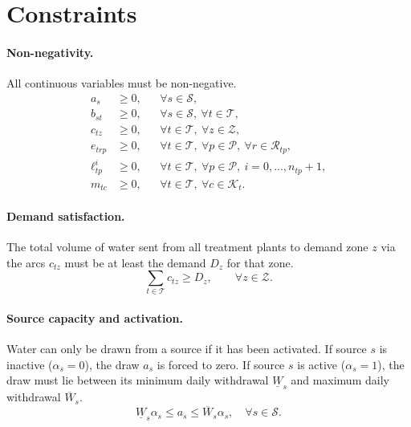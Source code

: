 \documentclass[10pt]{article}
\begin{document}
\section{Constraints} \label{sec:constraints} \paragraph{Non-negativity.}
All continuous variables must be non-negative.
\begin{equation}\label{eq:nonnegativity}
\begin{aligned}
    a_s &\ge 0,
    && \forall s \in \mathcal{S},\\
    b_{st} &\ge 0,
    && \forall s \in \mathcal{S},\ \forall t \in \mathcal{T},\\
    c_{tz} &\ge 0,
    && \forall t \in \mathcal{T},\ \forall z \in \mathcal{Z},\\
    e_{trp} &\ge 0,
    && \forall t \in \mathcal{T},\ \forall p \in \mathcal{P},\ \forall r \in \mathcal{R}_{tp},\\
    \ell^i_{tp} &\ge 0,
    && \forall t \in \mathcal{T},\ \forall p \in \mathcal{P},\ i=0,\dots,n_{tp}+1,\\
    m_{tc} &\ge 0,
    && \forall t \in \mathcal{T},\ \forall c \in \mathcal{K}_t.
\end{aligned}
\end{equation}

\paragraph{Demand satisfaction.}
The total volume of water sent from all treatment plants to demand zone $z$ via the arcs $c_{tz}$ must be at least the demand $D_z$ for that zone.
\begin{equation}\label{eq:demand}
    \sum_{t \in \mathcal{T}} c_{tz} \ge D_z, \qquad \forall z \in \mathcal{Z}.
\end{equation}

\paragraph{Source capacity and activation.}
Water can only be drawn from a source if it has been activated.
If source $s$ is inactive ($\alpha_s = 0$), the draw $a_s$ is forced to zero.
If source $s$ is active ($\alpha_s = 1$), the draw must lie between its minimum daily withdrawal $\underline{W}_s$ and maximum daily withdrawal $\overline{W}_s$.
\begin{equation}\label{eq:source_capacity}
    \underline{W}_s\alpha_s
    \leq
    a_s
    \leq
    \overline{W}_s\alpha_s,
    \quad \forall s \in \mathcal{S}.
\end{equation}
\end{document}
